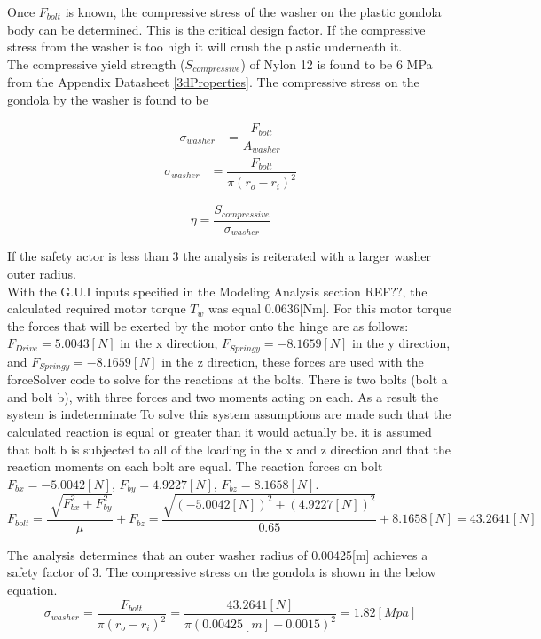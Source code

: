 \documentclass[../main.tex]{subfiles}
\begin{document}
Once $F_{bolt}$ is known, the compressive stress of the washer on the plastic gondola body can be determined. This is the critical design factor. If the compressive stress from the washer is too high it will crush the plastic underneath it.\\

The compressive yield strength ($S_{compressive}$) of Nylon 12  is found to be 6 MPa from the Appendix Datasheet \ref{3dProperties}. The compressive stress on the gondola by the washer is found to be 

\begin{align*}
\sigma _{washer} &= \dfrac{F_{bolt}}{A_{washer}}
\end{align*}
\begin{align}
\sigma _{washer} &= \dfrac{F_{bolt}}{\pi (r_o - r_i)^2}
\end{align}

\begin{equation}
\eta = \dfrac{S_{compressive}}{\sigma _{washer}}
\end{equation}

If the safety actor is less than 3 the analysis is reiterated with a larger washer outer radius.\\

With the G.U.I inputs specified in the Modeling Analysis section REF??, the calculated required motor torque $T_w$ was equal 0.0636[Nm]. For this motor torque the forces that will be exerted by the motor onto the hinge are as follows: $F_{Drive} = 5.0043[N]$ in the x direction, $F_{Springy} = -8.1659[N]$ in the y direction, and $F_{Springy} = -8.1659[N]$ in the z direction, these forces are used with the forceSolver code to solve for the reactions at the bolts. There is two bolts (bolt a and bolt b), with three forces and two moments acting on each. As a result the system is indeterminate To solve this system assumptions are made such that the calculated reaction is equal or greater than it would actually be. it is assumed that bolt b is subjected to all of the loading in the x and z direction and that the reaction moments on each bolt are equal. The reaction forces on bolt $F_{bx} = -5.0042[N]$, $F_{by} = 4.9227[N]$, $F_{bz} = 8.1658[N]$. 
\begin{equation*}
F_{bolt} = \dfrac{\sqrt[]{F_{bx}^2 + F_{by}^2}}{\mu} + F_{bz} = \dfrac{\sqrt{(-5.0042[N])^2 + (4.9227[N])^2}}{0.65} + 8.1658[N] = 43.2641[N]
\end{equation*}

The analysis determines that an outer washer radius of 0.00425[m] achieves a safety factor of 3. The compressive stress on the gondola is shown in the below equation. 
\begin{equation*}
\sigma _{washer} = \dfrac{F_{bolt}}{\pi (r_o - r_i)^2} = \dfrac{43.2641[N]}{\pi (0.00425[m] - 0.0015)^2}  = 1.82[Mpa] 
\end{equation*}
\end{document}
